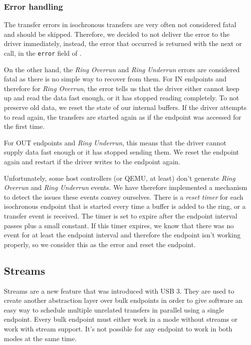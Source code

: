 \subsubsection{Error handling}

The transfer errors in isochronous transfers are very often not considered fatal
and should be skipped. Therefore, we decided to not deliver the
error to the driver immediately, instead, the error that occurred is returned with
the next  or  call, in the \texttt{error} field of
.

On the other hand, the \textit{Ring Overrun} and \textit{Ring Underrun} errors
are considered fatal as there is no simple way to recover from them. For IN
endpoints and therefore for \textit{Ring Overrun}, the error tells us that the
driver either cannot keep up and read the data fast enough, or it has stopped
reading completely. To not preserve old data, we reset the state of our
internal buffers. If the driver attempts to read again, the transfers are
started again as if the endpoint was accessed for the first time.

For OUT endpoints and \textit{Ring Underrun}, this means that the driver cannot
supply data fast enough or it has stopped sending them. We reset the endpoint
again and restart if the driver writes to the endpoint again.

Unfortunately, some host controllers (or QEMU, at least) don't generate
\textit{Ring Overrun} and \textit{Ring Underrun} events. We have therefore
implemented a mechanism to detect the issues these events convey ourselves.
There is a \textit{reset timer} for each isochronous endpoint that is started
every time a buffer is added to the ring, or a transfer event is received. The
timer is set to expire after the endpoint interval passes plus a small
constant. If this timer expires, we know that there was no event for at least
the endpoint interval and therefore the endpoint isn't working properly, so we
consider this as the error and reset the endpoint.

\subsection{Streams}

Streams are a new feature that was introduced with USB 3. They are used to
create another abstraction layer over bulk endpoints in order to give software
an easy way to schedule multiple unrelated transfers in parallel using a single
endpoint. Every bulk endpoint must either work in a mode without streams or
work with stream support. It's not possible for any endpoint to work in both
modes at the same time.


